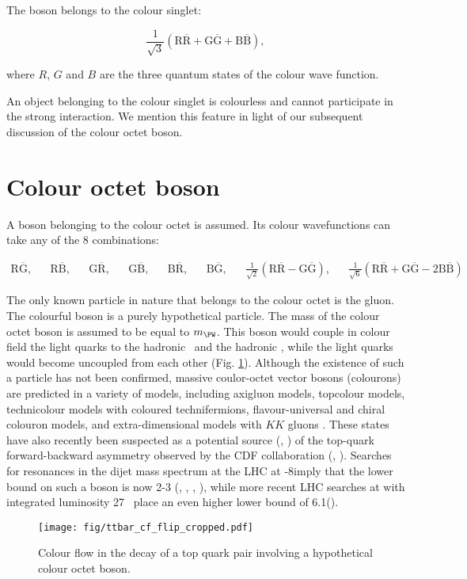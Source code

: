 The \PW boson belongs to the colour singlet:

\begin{equation}
\frac{1}{\sqrt{3}}\left(\text{R}\overline{\text{R}}+\text{G}\overline{\text{G}}+\text{B}\overline{\text{B}}\right),
\end{equation}

where $R$, $G$ and $B$ are the three quantum states of the colour wave function.

An object belonging to the colour singlet is colourless and cannot participate in the strong interaction. We mention this feature in light of our subsequent discussion of the colour octet \PW boson.

\section{Colour octet \PW boson}

A \PW boson belonging to the colour octet is assumed. Its colour wavefunctions can take any of the 8 combinations:

\begin{align}
\text{R}\overline{\text{G}}, && \text{R}\overline{\text{B}}, && \text{G}\overline{\text{R}}, && \text{G}\overline{\text{B}}, && \text{B}\overline{\text{R}}, && \text{B}\overline{\text{G}}, && \frac{1}{\sqrt{2}}\left(\text{R}\overline{\text{R}}-\text{G}\overline{\text{G}}\right), && \frac{1}{\sqrt{6}}\left(\text{R}\overline{\text{R}}+\text{G}\overline{\text{G}}-2\text{B}\overline{\text{B}}\right)
\end{align}

The only known particle in nature that belongs to the colour octet is the gluon. The colourful \PW boson is a purely hypothetical particle. The mass of the colour octet \PW boson is assumed to be equal to $m_{\PW}$. This boson would couple in colour field the light quarks to the hadronic \cPqb\ and the hadronic \cPqt, while the light quarks would become uncoupled from each other (Fig. \ref{fig:ttbar_cf_octet}).
Although the existence of such a particle has not been confirmed, massive coulor-octet vector bosons (colourons) are predicted in a variety of models, including axigluon models, topcolour models, technicolour models with coloured technifermions, flavour-universal and chiral colouron models, and extra-dimensional models with $KK$ gluons \cite{Chivukula:2013xla}.  These states have also recently been suspected as a potential source (\cite{Ferrario:2009bz}, \cite{Frampton:2009rk}) of the top-quark forward-backward asymmetry observed by the CDF collaboration (\cite{Aaltonen:2008hc}, \cite{Aaltonen:2011kc}). Searches for resonances in the dijet mass spectrum at the LHC at -8\TeV imply that the lower bound on such a boson is now 2-3 \TeV (\cite{Han:2010rf}, \cite{Haisch:2011up}, \cite{Chatrchyan:2011ns}, \cite{Aad:2011fq}), while more recent LHC searches at \TeV with integrated luminosity 27 \fbinv\ place an even higher lower bound of 6.1\TeV (\cite{CMS:2017xrr}).
  
  \begin{figure}[h!]
  \centering
  \texttt{[image: fig/ttbar\_cf\_flip\_cropped.pdf]}
  \caption{Colour flow in the decay of a top quark pair involving a hypothetical colour octet \PW boson.}
  \label{fig:ttbar_cf_octet}
\end{figure}

